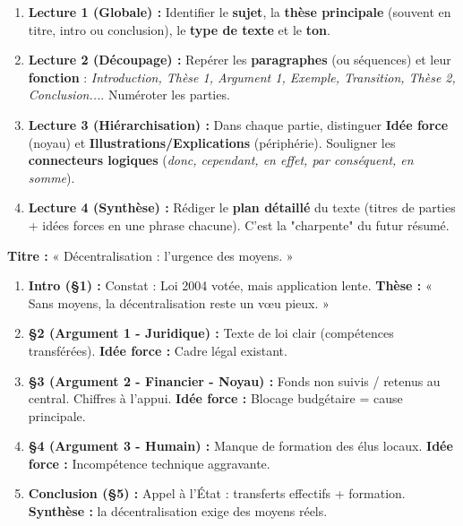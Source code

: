\documentclass[11pt]{article}
\begin{document}
\begin{methode}
\begin{enumerate}
\item \textbf{Lecture 1 (Globale) :} Identifier le \textbf{sujet}, la \textbf{thèse principale} (souvent en titre, intro ou conclusion), le \textbf{type de texte} et le \textbf{ton}.
\item \textbf{Lecture 2 (Découpage) :} Repérer les \textbf{paragraphes} (ou séquences) et leur \textbf{fonction} : \emph{Introduction, Thèse 1, Argument 1, Exemple, Transition, Thèse 2, Conclusion...}. Numéroter les parties.
\item \textbf{Lecture 3 (Hiérarchisation) :} Dans chaque partie, distinguer \textbf{Idée force} (noyau) et \textbf{Illustrations/Explications} (périphérie). Souligner les \textbf{connecteurs logiques} (\emph{donc, cependant, en effet, par conséquent, en somme}).
\item \textbf{Lecture 4 (Synthèse) :} Rédiger le \textbf{plan détaillé} du texte (titres de parties + idées forces en une phrase chacune). C'est la "charpente" du futur résumé.
\end{enumerate}
\end{methode}

\begin{exemplebox}
\textbf{Titre :} « Décentralisation : l'urgence des moyens. »
\begin{enumerate}
\item \textbf{Intro (§1) :} Constat : Loi 2004 votée, mais application lente. \textbf{Thèse :} « Sans moyens, la décentralisation reste un vœu pieux. »
\item \textbf{§2 (Argument 1 - Juridique) :} Texte de loi clair (compétences transférées). \textbf{Idée force :} Cadre légal existant.
\item \textbf{§3 (Argument 2 - Financier - Noyau) :} Fonds non suivis / retenus au central. Chiffres à l'appui. \textbf{Idée force :} Blocage budgétaire = cause principale.
\item \textbf{§4 (Argument 3 - Humain) :} Manque de formation des élus locaux. \textbf{Idée force :} Incompétence technique aggravante.
\item \textbf{Conclusion (§5) :} Appel à l'État : transferts effectifs + formation. \textbf{Synthèse :} la décentralisation exige des moyens réels.
\end{enumerate}
\end{exemplebox}
\end{document}
